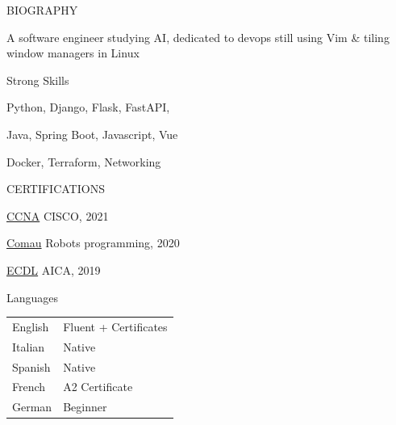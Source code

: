 \documentclass{cv} %
\begin{document}
\begin{minipage}[b][0.9\paperheight][t]{0.29\linewidth}

\begin{minipage}[c]{\linewidth}
    \centering
\end{minipage}

\begin{rSection}{BIOGRAPHY}
    \item A software engineer studying AI, dedicated to devops
        still using Vim \& tiling window managers in Linux
\end{rSection}

\begin{rSection}{Strong Skills}
    \item Python, Django, Flask, FastAPI,  
    \item Java, Spring Boot, Javascript, Vue
    \item Docker, Terraform, Networking
\end{rSection}

\begin{rSection}{CERTIFICATIONS}
    \item \underline{CCNA} {CISCO, 2021}
    \item \underline{Comau} {Robots programming, 2020}
    \item \underline{ECDL} {AICA, 2019}
\end{rSection}

\begin{rSection}{Languages}
    \vspace{0.2cm}
    \item \begin{tabular}{@{}ll@{}}
        English & Fluent + Certificates     \\
        Italian & Native                    \\
        Spanish & Native                    \\
        French  & A2 Certificate            \\
        German  & Beginner                  \\
    \end{tabular}
\end{rSection}


\end{minipage}
\end{document}
